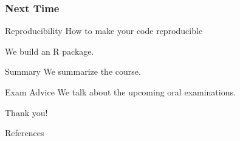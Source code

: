 \documentclass[aspectratio=1610,onlytextwidth]{beamer}
\begin{document}
\begin{frame}[c]
  \frametitle{Next Time}

  \begin{block}{Reproducibility}
    How to make your code reproducible

    \medskip

    We build an R package.
  \end{block}

  \pause

  \begin{block}{Summary}
    We summarize the course.
  \end{block}

  \pause

  \begin{block}{Exam Advice}
    We talk about the upcoming oral examinations.
  \end{block}

\end{frame}

\begin{frame}[standout]
  Thank you!
\end{frame}

\appendix

\begin{frame}[allowframebreaks]{References}
  \printbibliography[heading=none]
\end{frame}
\end{document}
